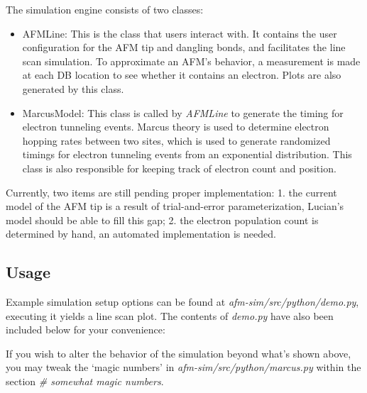 \documentclass{article}
\begin{document}
The simulation engine consists of two classes:

\begin{itemize}
  \item AFMLine: This is the class that users interact with. It contains the user configuration for the AFM tip and dangling bonds, and facilitates the line scan simulation. To approximate an AFM's behavior, a measurement is made at each DB location to see whether it contains an electron. Plots are also generated by this class.
  \item MarcusModel: This class is called by \textit{AFMLine} to generate the timing for electron tunneling events. Marcus theory is used to determine electron hopping rates between two sites, which is used to generate randomized timings for electron tunneling events from an exponential distribution. This class is also responsible for keeping track of electron count and position.
\end{itemize}

Currently, two items are still pending proper implementation: 1. the current model of the AFM tip is a result of trial-and-error parameterization, Lucian's model should be able to fill this gap; 2. the electron population count is determined by hand, an automated implementation is needed.


\subsection{Usage}

Example simulation setup options can be found at \textit{afm-sim/src/python/demo.py}, executing it yields a line scan plot. The contents of \textit{demo.py} have also been included below for your convenience:



If you wish to alter the behavior of the simulation beyond what's shown above, you may tweak the `magic numbers' in \textit{afm-sim/src/python/marcus.py} within the section \textit{\# somewhat magic numbers}.
\end{document}
